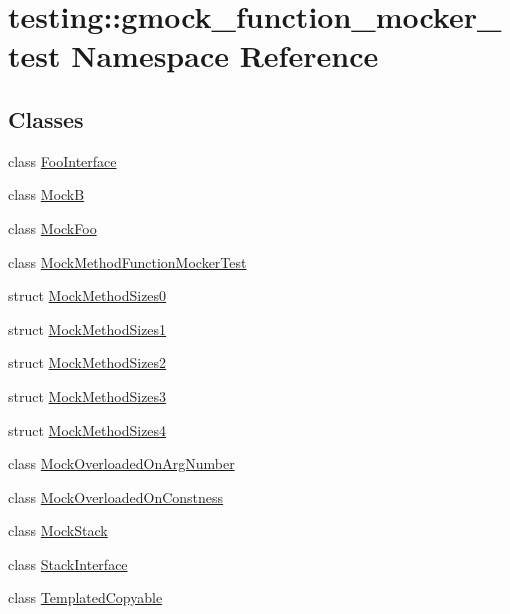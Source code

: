 \hypertarget{namespacetesting_1_1gmock__function__mocker__test}{}\section{testing\+::gmock\+\_\+function\+\_\+mocker\+\_\+test Namespace Reference}
\label{namespacetesting_1_1gmock__function__mocker__test}
\subsection*{Classes}
\begin{DoxyCompactItemize}
\item 
class \mbox{\hyperlink{classtesting_1_1gmock__function__mocker__test_1_1_foo_interface}{Foo\+Interface}}
\item 
class \mbox{\hyperlink{classtesting_1_1gmock__function__mocker__test_1_1_mock_b}{MockB}}
\item 
class \mbox{\hyperlink{classtesting_1_1gmock__function__mocker__test_1_1_mock_foo}{Mock\+Foo}}
\item 
class \mbox{\hyperlink{classtesting_1_1gmock__function__mocker__test_1_1_mock_method_function_mocker_test}{Mock\+Method\+Function\+Mocker\+Test}}
\item 
struct \mbox{\hyperlink{structtesting_1_1gmock__function__mocker__test_1_1_mock_method_sizes0}{Mock\+Method\+Sizes0}}
\item 
struct \mbox{\hyperlink{structtesting_1_1gmock__function__mocker__test_1_1_mock_method_sizes1}{Mock\+Method\+Sizes1}}
\item 
struct \mbox{\hyperlink{structtesting_1_1gmock__function__mocker__test_1_1_mock_method_sizes2}{Mock\+Method\+Sizes2}}
\item 
struct \mbox{\hyperlink{structtesting_1_1gmock__function__mocker__test_1_1_mock_method_sizes3}{Mock\+Method\+Sizes3}}
\item 
struct \mbox{\hyperlink{structtesting_1_1gmock__function__mocker__test_1_1_mock_method_sizes4}{Mock\+Method\+Sizes4}}
\item 
class \mbox{\hyperlink{classtesting_1_1gmock__function__mocker__test_1_1_mock_overloaded_on_arg_number}{Mock\+Overloaded\+On\+Arg\+Number}}
\item 
class \mbox{\hyperlink{classtesting_1_1gmock__function__mocker__test_1_1_mock_overloaded_on_constness}{Mock\+Overloaded\+On\+Constness}}
\item 
class \mbox{\hyperlink{classtesting_1_1gmock__function__mocker__test_1_1_mock_stack}{Mock\+Stack}}
\item 
class \mbox{\hyperlink{classtesting_1_1gmock__function__mocker__test_1_1_stack_interface}{Stack\+Interface}}
\item 
class \mbox{\hyperlink{classtesting_1_1gmock__function__mocker__test_1_1_templated_copyable}{Templated\+Copyable}}
\end{DoxyCompactItemize}

